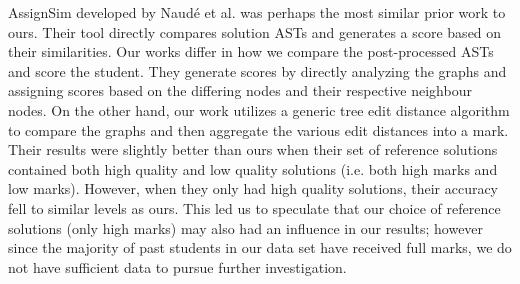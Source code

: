 AssignSim developed by Naud\'e et al. \cite{naude2010marking} was perhaps the most similar prior work to ours. Their tool directly compares solution ASTs and generates a score based on their similarities. Our works differ in how we compare the post-processed ASTs and score the student. They generate scores by directly analyzing the graphs and assigning scores based on the differing nodes and their respective neighbour nodes. On the other hand, our work utilizes a generic tree edit distance algorithm to compare the graphs and then aggregate the various edit distances into a mark. Their results were slightly better than ours when their set of reference solutions contained both high quality and low quality solutions (i.e. both high marks and low marks). However, when they only had high quality solutions, their accuracy fell to similar levels as ours. This led us to speculate that our choice of reference solutions (only high marks) may also had an influence in our results; however since the majority of past students in our data set have received full marks, we do not have sufficient data to pursue further investigation.
